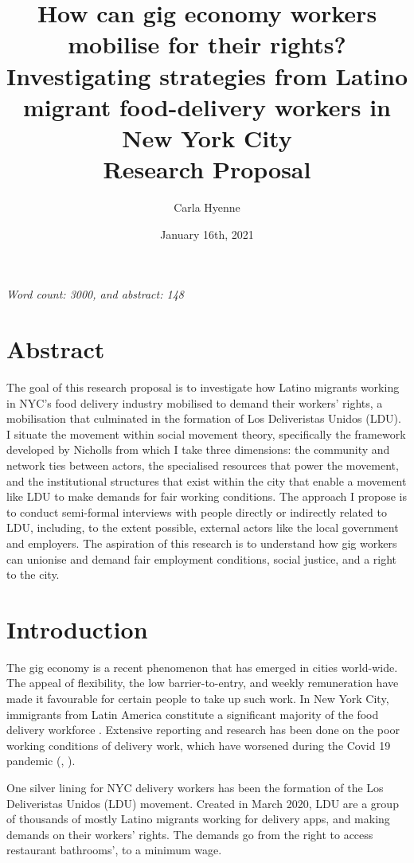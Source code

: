 \documentclass{article}[12pt]
\title{How can gig economy workers mobilise for their rights? Investigating strategies from Latino migrant food-delivery workers in New York City \\[5ex]Research Proposal \\[3ex]}
\author{Carla Hyenne}
\date{January 16th, 2021}
\begin{document}
\maketitle

\textit{Word count: 3000, and abstract: 148}

\section{Abstract}

The goal of this research proposal is to investigate how Latino migrants working in NYC’s food delivery industry mobilised to demand their workers’ rights, a mobilisation that culminated in the formation of Los Deliveristas Unidos (LDU).
I situate the movement within social movement theory, specifically the framework developed by Nicholls from which I take three dimensions: the community and network ties between actors, the specialised resources that power the movement, and the institutional structures that exist within the city that enable a movement like LDU to make demands for fair working conditions.
The approach I propose is to conduct semi-formal interviews with people directly or indirectly related to LDU, including, to the extent possible, external actors like the local government and employers.
The aspiration of this research is to understand how gig workers can unionise and demand fair employment conditions, social justice, and a right to the city.

\pagebreak

\section{Introduction}

The gig economy is a recent phenomenon that has emerged in cities world-wide. The appeal of flexibility, the low barrier-to-entry, and weekly remuneration have made it favourable for certain people to take up such work. In New York City, immigrants from Latin America constitute a significant majority of the food delivery workforce \parencite{ldu_report2021}. Extensive reporting and research has been done on the poor working conditions of delivery work, which have worsened during the Covid 19 pandemic (\parencite{newyorker2020uncertain}, \parencite{nytimes2021risk}).

One silver lining for NYC delivery workers has been the formation of the Los Deliveristas Unidos (LDU) movement. Created in March 2020, LDU are a group of thousands of mostly Latino migrants working for delivery apps, and making demands on their workers’ rights. The demands go from the right to access restaurant bathrooms’, to a minimum wage. 
\end{document}
